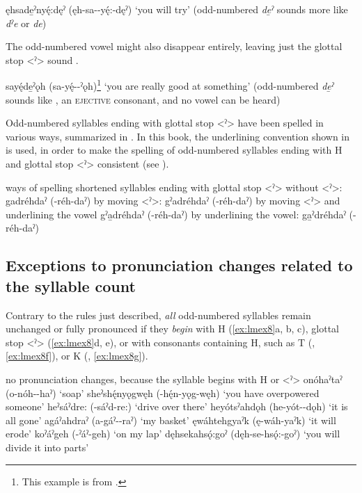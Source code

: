 \ea\label{ex:lmex22}
ęhsade̱ˀnyę́:dęˀ (ęh-sa--yę́:-dęˀ) ‘you will try’ (odd-numbered \textit{de̱ˀ} sounds more like \textit{dˀe} or \textit{de})
\z


The odd-numbered vowel might also disappear entirely, leaving just the glottal stop <ˀ> sound .

\ea\label{ex:lmex5}
sayę́de̱ˀǫh (sa-yę́--ˀǫh)\footnote{This example is from \citet{mithun_watewayestanih_1984}.} ‘you are really good at something’ (odd-numbered \textit{de̱ˀ} sounds like , an \textsc{ejective} consonant, and no vowel can be heard)
\z


Odd-numbered syllables ending with glottal stop <ˀ> have been spelled in various ways, summarized in . In this book, the underlining convention shown in  is used, in order to make the spelling of odd-numbered syllables ending with H and glottal stop <ˀ> consistent (see ).

\ea\label{ex:lmex6} ways of spelling shortened syllables ending with glottal stop <ˀ> 
\ea without <ˀ>: gadréhdaˀ (-réh-daˀ)\label{ex:lmex6a}
\ex by moving <ˀ>: gˀadréhdaˀ (-réh-daˀ)\label{ex:lmex6b}
\ex by moving <ˀ> and underlining the vowel gˀa̱dréhdaˀ (-réh-daˀ)\label{ex:lmex6c}
\ex by underlining the vowel: ga̱ˀdréhdaˀ (-réh-daˀ)\label{ex:lmex6d}
\z
\z

\subsection{Exceptions to pronunciation changes related to the syllable count}

Contrary to the rules just described, \emph{all} odd-numbered syllables remain unchanged or fully pronounced if they \emph{begin} with H (\ref{ex:lmex8}a, b, c), glottal stop <ˀ> (\ref{ex:lmex8}d, e), or with consonants containing H, such as T (,  \ref{ex:lmex8f}), or K (, \ref{ex:lmex8g}).

\ea\label{ex:lmex8} no pronunciation changes, because the syllable begins with H or <ˀ>
\ea onóhaˀtaˀ (o-nóh--haˀ) ‘soap’\label{ex:lmex8a}
\ex sheˀshę́nyǫgwęh (-hę́n-yǫg-węh) ‘you have overpowered someone’\label{ex:lmex8b}
\ex heˀsáˀdre: (-sáˀd-re:) ‘drive over there’\label{ex:lmex8c}
\ex heyótsˀahdǫh (he-yót--dǫh) ‘it is all gone’\label{ex:lmex8d}
\ex agáˀahdraˀ (a-gáˀ--raˀ) ‘my basket’\label{ex:lmex8e}
\ex ęwáhtehgyaˀk (ę-wáh-yaˀk) ‘it will erode’\label{ex:lmex8f}
\ex koˀáˀgeh (-ˀáˀ-geh) ‘on my lap’\label{ex:lmex8g}
\ex dęhsekahsǫ́:goˀ (dęh-se-hsǫ́:-goˀ) ‘you will divide it into parts’\label{ex:lmex8h}
\z
\z

